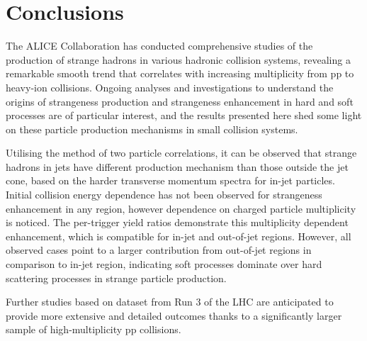 \section{Conclusions}

The ALICE Collaboration has conducted comprehensive studies of the production of strange hadrons in various hadronic collision systems, 
revealing a remarkable smooth trend that correlates with increasing multiplicity from pp to heavy-ion collisions. Ongoing analyses and investigations 
to understand the origins of strangeness production and strangeness enhancement in hard and soft processes are of particular interest, and the results 
presented here shed some light on these particle production mechanisms in small collision systems.

Utilising the method of two particle correlations, it can be observed that strange hadrons in jets have different production mechanism than 
those outside the jet cone, based on the harder transverse momentum spectra for in-jet particles. Initial collision energy dependence has not been 
observed for strangeness enhancement in any region, however dependence on charged particle multiplicity is noticed. The per-trigger yield 
ratios demonstrate this multiplicity dependent enhancement, which is compatible for in-jet and out-of-jet regions. However, all observed cases point to 
a larger contribution from out-of-jet regions in comparison to in-jet region, indicating soft processes dominate over hard scattering processes 
in strange particle production.

Further studies based on dataset from Run 3 of the LHC are anticipated to provide more extensive and detailed outcomes thanks to a significantly larger 
sample of high-multiplicity pp collisions.
